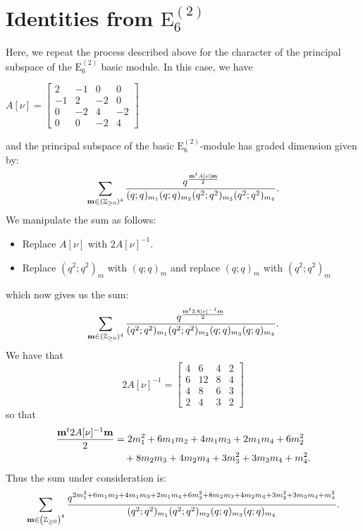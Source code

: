 \documentclass[ALCO,Unicode,published]{cedram}
\begin{document}
\section{Identities from \texorpdfstring{$\mathrm{E}_6^{(2)}$}{E\_6\^(2)}}
Here, we repeat the process described above for the character of the principal subspace of the $\mathrm{E}_6^{(2)}$ basic module. In this case, we have 
 \begin{center}
$
A[\nu] = \begin{bmatrix}
    2 & -1 & 0 & 0\\
    -1 & 2 & -2 & 0\\
    0 & -2 & 4 & -2\\
    0 & 0 & -2 & 4
\end{bmatrix}$
\end{center}
and the principal subspace of the basic $\mathrm{E}_6^{(2)}$-module has graded dimension given by:
\begin{equation}
\sum_{{\bf m} \in (\mathbb{Z}_{\ge 0})^4} \frac{q^{\frac{{\bf m}^t A[\nu] {\bf m}}{2}}}{(q;q)_{m_1} (q;q)_{m_{2}}(q^2; q^2)_{m_3}(q^2;q^2)_{m_4}}.
\end{equation}
We manipulate the sum as follows:
\begin{itemize}
\item Replace $A[\nu]$ with $2A[\nu]^{-1}$.
\item Replace $(q^2;q^2)_m$ with $(q;q)_m$ and replace $(q;q)_m$ with $(q^2;q^2)_m$
\end{itemize}
which now gives us the sum:
\begin{equation}
\sum_{{\bf m} \in (\mathbb{Z}_{\ge 0})^4} \frac{q^{\frac{{\bf m}^t 2A[\nu]^{-1} {\bf m}}{2}}}{(q^2;q^2)_{m_1} (q^2;q^2)_{m_{2}}(q; q)_{m_3}(q;q)_{m_4}}.
\end{equation}
We have that
$$
2A[\nu]^{-1}= \begin{bmatrix}
4 & 6 & 4  & 2\\
6 & 12 & 8 & 4\\
4 & 8 & 6 & 3\\
2 & 4 & 3 & 2
\end{bmatrix}
$$
so that
\begin{align*}
\frac{{\bf m}^t 2A[\nu]^{-1} {\bf m}}{2} &= 2m_1^2+6m_1m_2+4m_1m_3+2m_1m_4+6m_2^2\\
&\quad+8m_2m_3+4m_2m_4+3m_3^2+3m_3m_4+m_4^2.
\end{align*}
Thus the sum under consideration is:
$$
\sum_{{\bf m} \in \left(\mathbb{Z}_{\ge 0}\right)^4} \frac{q^{ 2m_1^2+6m_1m_2+4m_1m_3+2m_1m_4+6m_2^2+8m_2m_3+4m_2m_4+3m_3^2+3m_3m_4+m_4^2}}{(q^2;q^2)_{m_1}(q^2;q^2)_{m_2}(q;q)_{m_3}(q;q)_{m_4}}.
$$
\end{document}
